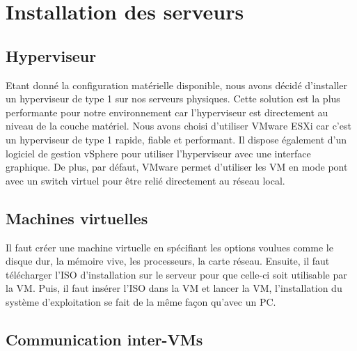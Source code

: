 \section{Installation des serveurs}
	\subsection{Hyperviseur}
Etant donné la configuration matérielle disponible, nous avons décidé d’installer un hyperviseur de type 1 sur nos serveurs physiques. Cette solution est la plus performante pour notre environnement car l’hyperviseur est directement au niveau de la couche matériel. Nous avons choisi d’utiliser VMware ESXi car c’est un hyperviseur de type 1 rapide, fiable et performant. Il dispose également d’un logiciel de gestion vSphere pour utiliser l’hyperviseur avec une interface graphique. De plus, par défaut, VMware permet d’utiliser les VM en mode pont avec un switch virtuel pour être relié directement au réseau local.

	\subsection{Machines virtuelles}
Il faut créer une machine virtuelle en spécifiant les options voulues comme le disque dur, la mémoire vive, les processeurs, la carte réseau. Ensuite, il faut télécharger l’ISO d’installation sur le serveur pour que celle-ci soit utilisable par la VM. Puis, il faut insérer l’ISO dans la VM et lancer la VM, l’installation du système d’exploitation se fait de la même façon qu’avec un PC. 

	\subsection{Communication inter-VMs}
